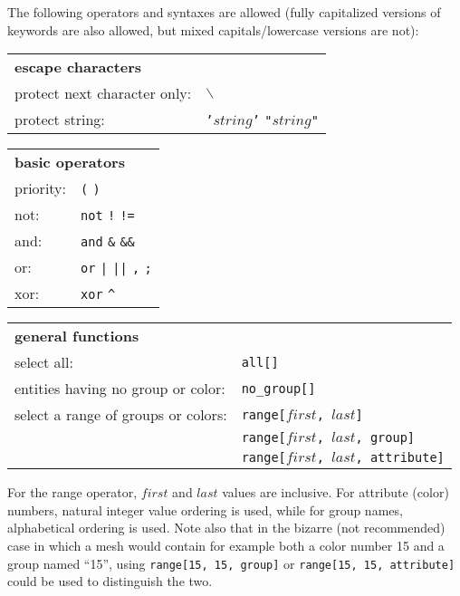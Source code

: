 {{{The following operators and syntaxes are allowed (fully capitalized
versions of keywords are also allowed, but mixed capitals/lowercase
versions are not):

\begin{tabular}[top]{p{6cm} l}
\multicolumn{2}{l}{\bf escape characters }\\
protect next character only: & \texttt{$\backslash$} \\
protect string:              & \texttt{{'}$string${'}} \quad \texttt{"$string$"}\\
\end{tabular}

\begin{tabular}[top]{p{6cm} l}
\multicolumn{2}{l}{\bf basic operators }\\
priority: & \texttt{(} \quad \texttt{)} \\
not:      &  \texttt{not} \quad \texttt{!} \quad \texttt{!=} \\
and:      &  \texttt{and} \quad \texttt{\&} \quad \texttt{\&\&} \\
or:       &  \texttt{or} \quad \texttt{|} \quad \texttt{||} \quad \texttt{,} \quad \texttt{;} \\
xor:      &  \texttt{xor} \quad \texttt{\^} \\
\end{tabular}

\begin{tabular}[top]{p{6cm} l}
\multicolumn{2}{l}{\bf general functions }\\
select all:                        &  \texttt{all[]}\\
entities having no group or color: &  \texttt{no\_group[]} \\
select a range of groups or colors: &  \texttt{range[$first$, $last$]} \\
                                    &  \texttt{range[$first$, $last$, group]} \\
                                    &  \texttt{range[$first$, $last$, attribute]} \\
\end{tabular}

For the range operator, $first$ and $last$ values are inclusive.
For attribute (color) numbers, natural integer value ordering is used,
while for group names, alphabetical ordering is used. Note also that in
the bizarre (not recommended) case in which a mesh would contain for
example both a color number 15 and a group named ``15'', using
\texttt{range[15, 15, group]} or \texttt{range[15, 15, attribute]}
could be used to distinguish the two.

}}}
